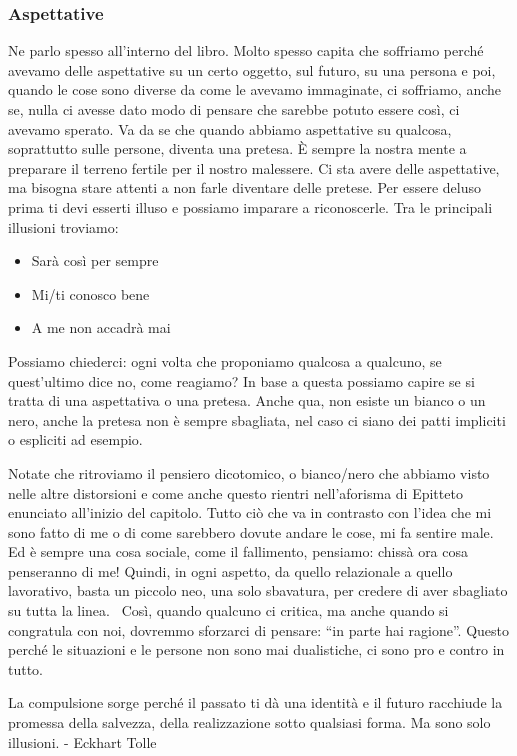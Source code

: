 \documentclass[12pt]{book} %
\begin{document}
\subsubsection{Aspettative}
Ne parlo spesso all'interno del libro. Molto spesso capita che soffriamo perché avevamo delle
aspettative su un certo oggetto, sul futuro, su una persona e poi, quando le cose sono diverse da come le avevamo
immaginate, ci soffriamo, anche se, nulla ci avesse dato modo di pensare che sarebbe potuto essere così, ci avevamo
sperato. Va da se che quando abbiamo aspettative su qualcosa, soprattutto sulle persone, diventa una pretesa. È sempre
la nostra mente a preparare il terreno fertile per il nostro malessere.
Ci sta avere delle aspettative, ma bisogna stare attenti a non farle diventare delle pretese. 
Per essere deluso prima ti devi esserti illuso e possiamo imparare a riconoscerle. Tra le principali illusioni troviamo:

\begin{itemize}
\item Sarà così per sempre
\item Mi/ti conosco bene
\item A me non accadrà mai
\end{itemize}
Possiamo chiederci: ogni volta che proponiamo qualcosa a qualcuno, se quest'ultimo dice no, come reagiamo? In base a
questa possiamo capire se si tratta di una aspettativa o una pretesa. Anche qua, non esiste un bianco o un nero, anche
la pretesa non è sempre sbagliata, nel caso ci siano dei patti impliciti o espliciti ad esempio.

Notate che ritroviamo il pensiero dicotomico, o bianco/nero che abbiamo visto nelle altre distorsioni e come anche
questo rientri nell'aforisma di Epitteto enunciato all'inizio del capitolo.
Tutto ciò che va in contrasto con l'idea che mi sono fatto di me o di come sarebbero dovute andare le cose, mi fa
sentire male. Ed è sempre una cosa sociale, come il fallimento, pensiamo: chissà ora cosa penseranno di me! Quindi, in
ogni aspetto, da quello relazionale a quello lavorativo, basta un piccolo neo, una solo sbavatura, per credere di aver
sbagliato su tutta la linea. \ Così, quando qualcuno ci critica, ma anche quando si congratula con noi, dovremmo
sforzarci di pensare: “in parte hai ragione”. Questo perché le situazioni e le persone non sono mai dualistiche, ci
sono pro e contro in tutto. 

{\textquotedbl}La compulsione sorge perché il passato ti dà una identità e il futuro racchiude la promessa della
salvezza, della realizzazione sotto qualsiasi forma. Ma sono solo illusioni.{\textquotedbl} - Eckhart Tolle
\end{document}

